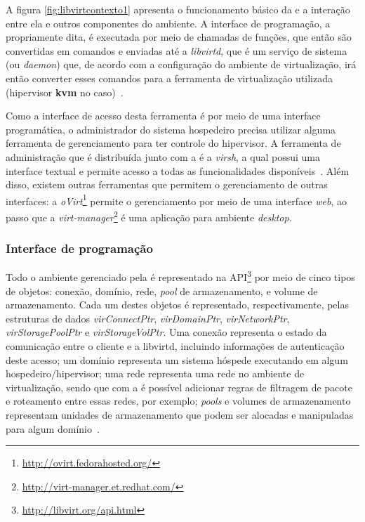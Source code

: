 A figura \ref{fig:libvirtcontexto1} apresenta o funcionamento básico da
\libvirt{} e a interação entre ela e outros componentes do ambiente. A
interface de programação, a \libvirt{} propriamente dita, é executada por meio
de chamadas de funções, que então são convertidas em comandos e enviadas até a
\emph{libvirtd}, que é um serviço de sistema (ou \emph{daemon}) que, de acordo
com a configuração do ambiente de virtualização, irá então converter esses
comandos para a ferramenta de virtualização utilizada (hipervisor \textbf{kvm}
no caso)~\cite{bolte2010non}.

Como a interface de acesso desta ferramenta é por meio de uma interface
programática, o administrador do sistema hospedeiro precisa
utilizar alguma ferramenta de gerenciamento para ter controle do hipervisor. A
ferramenta de administração que é distribuída junto com a \libvirt{} é a
\emph{virsh}, a qual possui uma interface textual e permite acesso a todas as
funcionalidades disponíveis~\cite{virsh2008asilva}. Além disso, existem outras
ferramentas que permitem o gerenciamento de outras interfaces: a
\emph{oVirt}\footnote{\url{http://ovirt.fedorahosted.org/}} permite o
gerenciamento por meio de uma interface \emph{web}, ao passo que a
\emph{virt-manager}\footnote{\url{http://virt-manager.et.redhat.com/}} é uma
aplicação para ambiente \emph{desktop}.

\subsubsection{Interface de programação}\label{sec:libvirtapi}

Todo o ambiente gerenciado pela \libvirt{} é representado na
API\footnote{\url{http://libvirt.org/api.html}} por meio de cinco tipos de
objetos: conexão, domínio, rede, \emph{pool} de armazenamento, e volume de
armazenamento. Cada um destes objetos é representado, respectivamente, pelas
estruturas de dados \emph{virConnectPtr}, \emph{virDomainPtr},
\emph{virNetworkPtr}, \emph{virStoragePoolPtr} e \emph{virStorageVolPtr}. Uma
conexão representa o estado da comunicação entre o cliente e a
libvirtd, incluindo informações de autenticação deste acesso; um
domínio representa um sistema hóspede executando em algum
hospedeiro/hipervisor; uma rede representa uma rede no ambiente de
virtualização, sendo que com a \libvirt{} é possível adicionar regras de filtragem de
pacote e roteamento entre essas redes, por exemplo; \emph{pools} e volumes de
armazenamento representam unidades de armazenamento que podem ser alocadas e
manipuladas para algum domínio~\cite{libvirtapi}.

